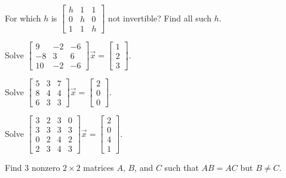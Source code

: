 \begin{exercise}
For which $h$ is
$\left[ \begin{smallmatrix}
h & 1 & 1 \\
0 & h & 0 \\
1 & 1 & h
\end{smallmatrix} \right]$
not invertible?  Find all such $h$.
\end{exercise}

\begin{exercise}
Solve
$\left[ \begin{smallmatrix}
9 & -2 & -6 \\
-8 & 3 & 6 \\
10 & -2 & -6
\end{smallmatrix} \right] \vec{x} =
\left[ \begin{smallmatrix}
1 \\
2 \\
3
\end{smallmatrix} \right]$.
\end{exercise}

\begin{exercise}
Solve
$\left[ \begin{smallmatrix}
5 & 3 & 7 \\
8 & 4 & 4 \\
6 & 3 & 3
\end{smallmatrix} \right] \vec{x} =
\left[ \begin{smallmatrix}
2 \\
0 \\
0
\end{smallmatrix} \right]$.
\end{exercise}

\begin{exercise}
Solve
$\left[ \begin{smallmatrix}
3 & 2 & 3 & 0 \\
3 & 3 & 3 & 3 \\
0 & 2 & 4 & 2 \\
2 & 3 & 4 & 3 
\end{smallmatrix} \right] \vec{x} =
\left[ \begin{smallmatrix}
2 \\
0 \\
4 \\
1
\end{smallmatrix} \right]$.
\end{exercise}

\begin{exercise}
Find 3 nonzero $2 \times 2$ matrices $A$, $B$, and $C$ such that
$AB = AC$ but $B \neq C$.
\end{exercise}

